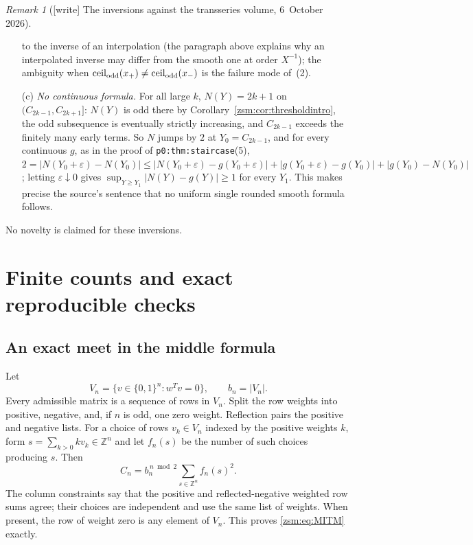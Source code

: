 \documentclass[11pt]{article}
\theoremstyle{definition}\newtheorem{definition}[theorem]{Definition}
\theoremstyle{remark}\newtheorem{remark}[theorem]{Remark}
\newcommand{\Z}{\mathbb Z}
\newcommand{\ceilodd}{\operatorname{ceil}_{\rm odd}}
\newcommand{\file}[1]{\nolinkurl{#1}}
\begin{document}
\begin{remark}[{[write]} The inversions against the transseries volume, 6~October 2026]
\begin{enumerate}
 to the inverse of an interpolation (the paragraph above explains why an
 interpolated inverse may differ from the smooth one at order $X^{-1}$); the
 ambiguity when $\ceilodd(x_+)\ne\ceilodd(x_-)$ is the failure mode
 of~(2).
\item[(c)] \emph{No continuous formula.} For all large $k$,
 $N(Y)=2k+1$ on $(C_{2k-1},C_{2k+1}]$: $N(Y)$ is odd there by
 Corollary~\ref{zsm:cor:thresholdintro}, the odd subsequence is eventually
 strictly increasing, and $C_{2k-1}$ exceeds the finitely many early terms.
 So $N$ jumps by $2$ at $Y_0=C_{2k-1}$, and for every continuous $g$, as in
 the proof of \file{p0:thm:staircase}(5),
 $2=|N(Y_0+\varepsilon)-N(Y_0)|\le|N(Y_0+\varepsilon)-g(Y_0+\varepsilon)|
 +|g(Y_0+\varepsilon)-g(Y_0)|+|g(Y_0)-N(Y_0)|$; letting
 $\varepsilon\downarrow0$ gives $\sup_{Y\ge Y_1}|N(Y)-g(Y)|\ge1$ for every
 $Y_1$. This makes precise the source's sentence that no uniform single
 rounded smooth formula follows.
\end{enumerate}
No novelty is claimed for these inversions.
\end{remark}

\section{Finite counts and exact reproducible checks}\label{zsm:sec:checks}
\subsection{An exact meet in the middle formula}
Let
\[
 V_n=\{v\in\{0,1\}^n:w^Tv=0\},\qquad b_n=|V_n|.
\]
Every admissible matrix is a sequence of rows in $V_n$. Split the row weights
into positive, negative, and, if $n$ is odd, one zero weight. Reflection pairs
the positive and negative lists. For a choice of rows $v_k\in V_n$ indexed by
the positive weights $k$, form $s=\sum_{k>0}kv_k\in\Z^n$ and let $f_n(s)$ be
the number of such choices producing $s$. Then
\begin{equation}\label{zsm:eq:MITM}
 C_n=b_n^{\,n\bmod2}\sum_{s\in\Z^n}f_n(s)^2.
\end{equation}
The column constraints say that the positive and reflected-negative weighted
row sums agree; their choices are independent and use the same list of
weights. When present, the row of weight zero is any element of $V_n$. This
proves \eqref{zsm:eq:MITM} exactly.
\end{document}
